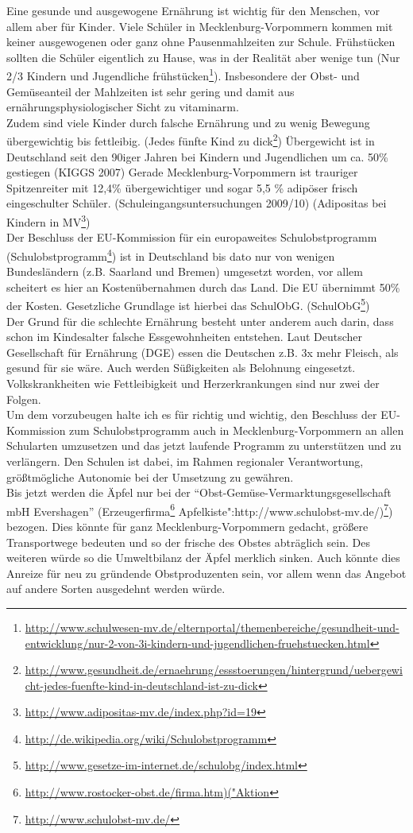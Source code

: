 Eine gesunde und ausgewogene Ernährung ist wichtig für den Menschen, vor allem aber für Kinder. Viele Schüler in Mecklenburg-Vorpommern kommen mit keiner ausgewogenen oder ganz ohne Pausenmahlzeiten zur Schule. Frühstücken sollten die Schüler eigentlich zu Hause, was in der Realität aber wenige tun (Nur 2/3 Kindern und Jugendliche frühstücken\footnote{\url{http://www.schulwesen-mv.de/elternportal/themenbereiche/gesundheit-und-entwicklung/nur-2-von-3i-kindern-und-jugendlichen-fruehstuecken.html}}). Insbesondere der Obst- und Gemüseanteil der Mahlzeiten ist sehr gering und damit aus ernährungsphysiologischer Sicht zu vitaminarm.\\Zudem sind viele Kinder durch falsche Ernährung und zu wenig Bewegung übergewichtig bis fettleibig. (Jedes fünfte Kind zu dick\footnote{\url{http://www.gesundheit.de/ernaehrung/essstoerungen/hintergrund/uebergewicht-jedes-fuenfte-kind-in-deutschland-ist-zu-dick}}) Übergewicht ist in Deutschland seit den 90iger Jahren bei Kindern und Jugendlichen um ca. 50\% gestiegen (KIGGS 2007) Gerade Mecklenburg-Vorpommern ist trauriger Spitzenreiter mit 12,4\% übergewichtiger und sogar 5,5 \% adipöser frisch eingeschulter Schüler. (Schuleingangsuntersuchungen 2009/10) (Adipositas bei Kindern in MV\footnote{\url{http://www.adipositas-mv.de/index.php?id=19}})\\Der Beschluss der EU-Kommission für ein europaweites Schulobstprogramm (Schulobstprogramm\footnote{\url{http://de.wikipedia.org/wiki/Schulobstprogramm}}) ist in Deutschland bis dato nur von wenigen Bundesländern (z.B. Saarland und Bremen) umgesetzt worden, vor allem scheitert es hier an Kostenübernahmen durch das Land. Die EU übernimmt 50\% der Kosten. Gesetzliche Grundlage ist hierbei das SchulObG. (SchulObG\footnote{\url{http://www.gesetze-im-internet.de/schulobg/index.html}})\\Der Grund für die schlechte Ernährung besteht unter anderem auch darin, dass schon im Kindesalter falsche Essgewohnheiten entstehen. Laut Deutscher Gesellschaft für Ernährung (DGE) essen die Deutschen z.B. 3x mehr Fleisch, als gesund für sie wäre. Auch werden Süßigkeiten als Belohnung eingesetzt. Volkskrankheiten wie Fettleibigkeit und Herzerkrankungen sind nur zwei der Folgen.\\Um dem vorzubeugen halte ich es für richtig und wichtig, den Beschluss der EU-Kommission zum Schulobstprogramm auch in Mecklenburg-Vorpommern an allen Schularten umzusetzen und das jetzt laufende Programm zu unterstützen und zu verlängern. Den Schulen ist dabei, im Rahmen regionaler Verantwortung, größtmögliche Autonomie bei der Umsetzung zu gewähren.\\Bis jetzt werden die Äpfel nur bei der ``Obst-Gemüse-Vermarktungsgesellschaft mbH Evershagen'' (Erzeugerfirma\footnote{\url{http://www.rostocker-obst.de/firma.htm)("Aktion}} Apfelkiste":http://www.schulobst-mv.de/)\footnote{\url{http://www.schulobst-mv.de/}}) bezogen. Dies könnte für ganz Mecklenburg-Vorpommern gedacht, größere Transportwege bedeuten und so der frische des Obstes abträglich sein. Des weiteren würde so die Umweltbilanz der Äpfel merklich sinken. Auch könnte dies Anreize für neu zu gründende Obstproduzenten sein, vor allem wenn das Angebot auf andere Sorten ausgedehnt werden würde.

